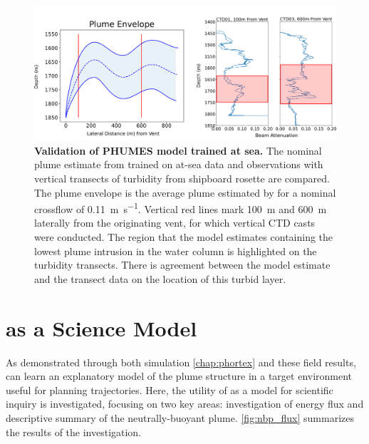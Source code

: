 \begin{figure}
    \centering
    \includegraphics[width=1\columnwidth]{figures/field_validation.png}
    \caption[Validation of \PHUMES model trained at sea.]{\textbf{Validation of PHUMES model trained at sea.} The nominal plume estimate from \PHUMES trained on at-sea data and \Sentry observations with vertical transects of turbidity from shipboard rosette are compared. The plume envelope is the average plume estimated by \PHUMES for a nominal crossflow of \SI{0.11}{\meter\per\second}. Vertical red lines mark \SI{100}{\meter} and \SI{600}{\meter} laterally from the originating vent, for which vertical CTD casts were conducted. The region that the model estimates containing the lowest plume intrusion in the water column is highlighted on the turbidity transects. There is agreement between the model estimate and the transect data on the location of this turbid layer.} 
    \label{fig:field_valid}
\end{figure}

\section{\PHUMES as a Science Model}
\label{sec:phumes_as_science}
As demonstrated through both simulation \cref{chap:phortex} and these field results, \PHUMES can learn an explanatory model of the plume structure in a target environment useful for planning \PHORTEX trajectories. Here, the utility of \PHUMES as a model for scientific inquiry is investigated, focusing on two key areas: investigation of energy flux and descriptive summary of the neutrally-buoyant plume. \cref{fig:nbp_flux} summarizes the results of the investigation.

